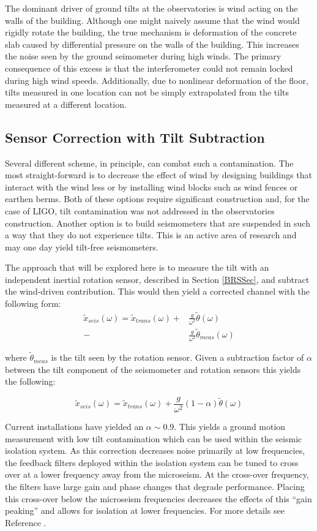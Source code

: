 \documentclass [12pt, proquest]{uwthesis}[2019]
\begin{document}
The dominant driver of ground tilts at the observatories is wind acting on the walls of the building. Although one might naively assume that the wind would rigidly rotate the building, the true mechanism is deformation of the concrete slab caused by differential pressure on the walls of the building. This increases the noise seen by the ground seimometer during high winds. The primary consequence of this excess is that the interferometer could not remain locked during high wind speeds. Additionally, due to nonlinear deformation of the floor, tilts measured in one location can not be simply extrapolated from the tilts measured at a different location.

\subsection{Sensor Correction with Tilt Subtraction}

\quad Several different scheme, in principle, can combat such a contamination. The most straight-forward is to decrease the effect of wind by designing buildings that interact with the wind less or by installing wind blocks such as wind fences or earthen berms. Both of these options require significant construction and, for the case of LIGO, tilt contamination was not addressed in the observatories construction. Another option is to build seismometers that are suspended in such a way that they do not experience tilts. This is an active area of research and may one day yield tilt-free seismometers. \cite{tiltFree}

The approach that will be explored here is to measure the tilt with an independent inertial rotation sensor, described in Section \ref{BRSSec}, and subtract the wind-driven contribution. This would then yield a corrected channel with the following form:
\begin{align}
\tilde{x}_{seis}(\omega)=\tilde{x}_{trans}(\omega)+&\frac{g}{\omega^2}\tilde{\theta}(\omega)\\
-&\frac{g}{\omega^2}\tilde{\theta}_{meas}(\omega)
\end{align}

where $\tilde{\theta}_{meas}$ is the tilt seen by the rotation sensor. Given a subtraction factor of $\alpha$ between the tilt component of the seismometer and rotation sensors this yields the following:

\[\tilde{x}_{seis}(\omega)=\tilde{x}_{trans}(\omega)+\frac{g}{\omega^2}(1-\alpha)\tilde{\theta}(\omega)\]

Current installations have yielded an $\alpha\sim 0.9$. This yields a ground motion measurement with low tilt contamination which can be used within the seismic isolation system. As this correction decreases noise primarily at low frequencies, the feedback filters deployed within the isolation system can be tuned to cross over at a lower frequency away from the microseism. At the cross-over frequency, the filters have large gain and phase changes that degrade performance. Placing this cross-over below the microseism frequencies decreases the effects of this ``gain peaking'' and allows for isolation at lower frequencies. For more details see Reference \cite{windproofing}.
\end{document}
